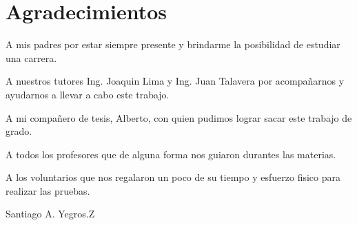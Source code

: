 
\chapter*{Agradecimientos}

A mis padres por estar siempre presente y brindarme la posibilidad de estudiar una carrera.

A nuestros tutores Ing. Joaquin Lima y Ing. Juan Talavera por acompañarnos y ayudarnos a llevar a cabo este trabajo.

A mi compañero de tesis, Alberto, con quien pudimos lograr sacar este trabajo de grado.

A todos los profesores que de alguna forma nos guiaron durantes las materias.

A los voluntarios que nos regalaron un poco de su tiempo y esfuerzo fisico para realizar las pruebas.

\begin{flushright}
	Santiago A. Yegros.Z
\end{flushright}

\blankpagelegend
